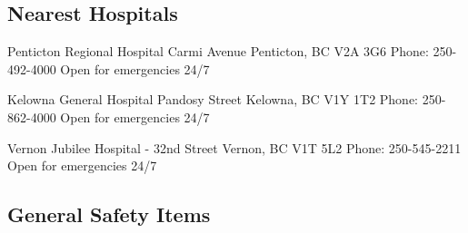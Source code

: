 \documentclass[11pt,letter]{article}
\begin{document}
\subsection {Nearest Hospitals}
Penticton Regional Hospital  Carmi Avenue\newline
Penticton, BC V2A 3G6\newline
Phone: 250-492-4000\newline
Open for emergencies 24/7\newline

Kelowna General Hospital Pandosy Street\newline
Kelowna, BC V1Y 1T2\newline
Phone: 250-862-4000\newline
Open for emergencies 24/7\newline

Vernon Jubilee Hospital - 32nd Street\newline
Vernon, BC V1T 5L2\newline
Phone: 250-545-2211\newline
Open for emergencies 24/7\newline

\subsection {General Safety Items}
\end{document}
